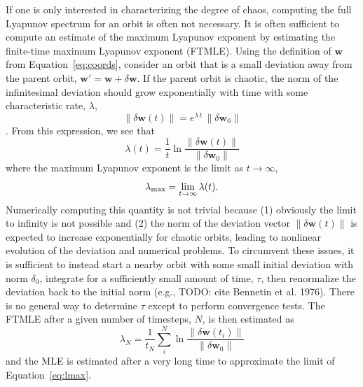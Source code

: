 \documentclass[letterpaper,12pt,preprint]{aastex}
\newcommand{\bs}[1]{\boldsymbol{#1}}
\begin{document}
If one is only interested in characterizing the degree of chaos, computing the full Lyapunov spectrum for an orbit is often not necessary. It is often sufficient to compute an estimate of the maximum Lyapunov exponent by estimating the finite-time maximum Lyapunov exponent (FTMLE). Using the definition of $\boldsymbol{w}$ from Equation~\ref{eq:coords}, consider an orbit that is a small deviation away from the parent orbit, $\boldsymbol{w}' = \boldsymbol{w} + \delta\boldsymbol{w}$. If the parent orbit is chaotic, the norm of the infinitesimal deviation should grow exponentially with time with some characteristic rate, $\lambda$,
\begin{equation}
	\|\delta\boldsymbol{w}(t)\| = e^{\lambda \, t} \, \|\delta\boldsymbol{w}_0\|
\end{equation}
\citep[see, e.g.,][]{who?}. From this expression, we see that
\begin{equation}
	\lambda(t) = \frac{1}{t}\ln \frac{\|\delta \bs{w}(t)\|}{\|\delta \bs{w}_0\|} \label{eq:mle}
\end{equation}
where the maximum Lyapunov exponent is the limit as $t\rightarrow \infty$,
\begin{equation}
	\lambda_{\rm max} = \lim_{t\rightarrow\infty}\lambda(t). \label{eq:lmax}
\end{equation}
Numerically computing this quantity is not trivial because (1) obviously the limit to infinity is not possible and (2) the norm of the deviation vector $\|\delta \bs{w}(t)\|$ is expected to increase exponentially for chaotic orbits, leading to nonlinear evolution of the deviation and numerical problems. To circumvent these issues, it is sufficient to instead start a nearby orbit with some small initial deviation with norm $\delta_0$, integrate for a sufficiently small amount of time, $\tau$, then renormalize the deviation back to the initial norm (e.g., TODO: cite Bennetin et al. 1976). There is no general way to determine $\tau$ except to perform convergence tests.
The FTMLE after a given number of timesteps, $N$, is then estimated as
\begin{equation}
	\lambda_N = \frac{1}{t_N}\sum_i^N \ln \frac{\|\delta \bs{w}(t_i)\|}{\|\delta \bs{w}_0\|} \label{eq:ftmle}
\end{equation}
and the MLE is estimated after a very long time to approximate the limit of Equation~\ref{eq:lmax}.
\end{document}
